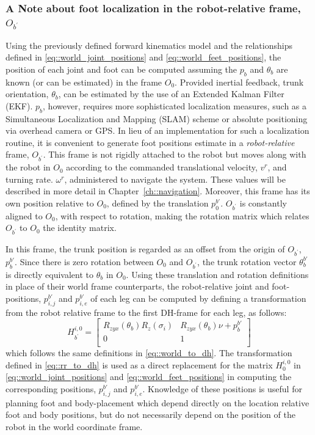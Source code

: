 			\subsubsection{A Note about foot localization in the robot-relative frame, $O_{b^{'}}$}

			Using the previously defined forward kinematics model and the relationships defined in \ref{eq::world_joint_positions} and \ref{eq::world_feet_positions}, the position of each joint and foot can be computed assuming the $p_{b}$ and $\theta_{b}$ are known (or can be estimated) in the frame $O_{0}$. Provided inertial feedback, trunk orientation, $\theta_{b}$, can be estimated by the use of an Extended Kalman Filter (EKF). $p_{b}$, however, requires more sophisticated localization measures, such as a Simultaneous Localization and Mapping (SLAM) scheme or absolute positioning via overhead camera or GPS. In lieu of an implementation for such a localization routine, it is convenient to generate foot positions estimate in a \emph{robot-relative} frame, $O_{b^{'}}$. This frame is not rigidly attached to the robot but moves along with the robot in $O_{0}$ according to the commanded translational velocity, $v^{r}$, and turning rate. $\omega^{r}$, administered to navigate the system. These values will be described in more detail in Chapter~\ref{ch::navigation}. Moreover, this frame has its own position relative to $O_{0}$, defined by the translation $p_{0}^{b'}$. $O_{b^{'}}$ is constantly aligned to $O_{0}$, with respect to rotation, making the rotation matrix which relates $O_{b^{'}}$ to $O_{0}$ the identity matrix.

			In this frame, the trunk position is regarded as an offset from the origin of $O_{b^{'}}$, $p_{b}^{b'}$. Since there is zero rotation between $O_{0}$ and $O_{b^{'}}$, the trunk rotation vector $\theta_{b}^{b'}$ is directly equivalent to $\theta_{b}$ in $O_{0}$. Using these translation and rotation definitions in place of their world frame counterparts, the robot-relative joint and foot-positions, ${p}_{i,j}^{b'}$ and ${p}_{i,e}^{b'}$ of each \Ith leg can be computed by defining a transformation from the robot relative frame to the first DH-frame for each leg, as follows:
				\begin{equation}
					H_{b^{'}}^{i,0} = 
					\left[ 
					\begin{array}{c|c}
						R_{zyx}(\theta_{b}) R_{z}(\sigma_{i})	&R_{zyx}(\theta_{b}) \nu + {p}_{b}^{b'} 	\\ \hline
						0										&	1												\\
					\end{array} 
					\right]
					\label{eq::rr_to_dh}
				\end{equation}
			which follows the same definitions in \ref{eq::world_to_dh}. The transformation defined in \ref{eq::rr_to_dh} is used as a direct replacement for the matrix $H_{0}^{i,0}$ in \ref{eq::world_joint_positions} and \ref{eq::world_feet_positions} in computing the corresponding positions, ${p}_{i,j}^{b'}$ and ${p}_{i,e}^{b'}$. Knowledge of these positions is useful for planning foot and body-placement which depend directly on the location relative foot and body positions, but do not necessarily depend on the position of the robot in the world coordinate frame.
 

